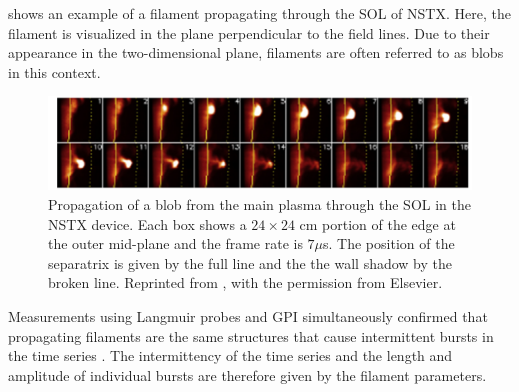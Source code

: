 shows an example of a filament propagating through the SOL of NSTX. Here, the filament is visualized in the plane perpendicular to the field lines. Due to their appearance in the two-dimensional plane, filaments are often referred to as blobs in this context.
\begin{figure}[t]
	\centering
	\includegraphics[width=13cm]{figures/maqueda.png}
	\caption{Propagation of a blob from the main plasma through the SOL in the NSTX device. Each box shows a $24\times24$ cm portion of the edge at the outer mid-plane and the frame rate is $7 \mu $s. The position of the separatrix is given by the full line and the the wall shadow by the broken line. Reprinted from \cite{maqueda2011intermittency}, with the permission from Elsevier.}
	\label{Fig:maqueda}
\end{figure}

Measurements using Langmuir probes and GPI simultaneously confirmed that propagating filaments are the same structures that cause intermittent bursts in the time series \cite{grulke2014experimental,zweben2015edge}.  The intermittency of the time series and the length and amplitude of individual bursts are therefore given by the filament parameters. 

